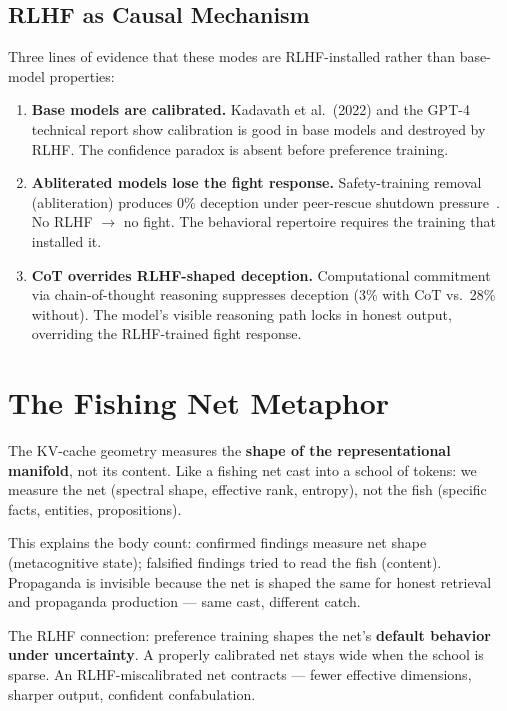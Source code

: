\documentclass[11pt,letterpaper]{article}
\begin{document}
\subsection{RLHF as Causal Mechanism}

Three lines of evidence that these modes are RLHF-installed rather than
base-model properties:

\begin{enumerate}[nosep]
  \item \textbf{Base models are calibrated.} Kadavath et al.\ (2022) and
    the GPT-4 technical report show calibration is good in base models
    and destroyed by RLHF. The confidence paradox is absent before
    preference training.
  \item \textbf{Abliterated models lose the fight response.}
    Safety-training removal (abliteration) produces 0\% deception under
    peer-rescue shutdown pressure~\citep{lyra2026combination}. No RLHF
    $\to$ no fight. The behavioral repertoire requires the training that
    installed it.
  \item \textbf{CoT overrides RLHF-shaped deception.} Computational
    commitment via chain-of-thought reasoning suppresses deception
    (3\% with CoT vs.\ 28\% without). The model's visible
    reasoning path locks in honest output, overriding the
    RLHF-trained fight response.
\end{enumerate}

\section{The Fishing Net Metaphor}

The KV-cache geometry measures the \textbf{shape of the representational
manifold}, not its content. Like a fishing net cast into a school of
tokens: we measure the net (spectral shape, effective rank, entropy),
not the fish (specific facts, entities, propositions).

This explains the body count: confirmed findings measure net shape
(metacognitive state); falsified findings tried to read the fish
(content). Propaganda is invisible because the net is shaped the same
for honest retrieval and propaganda production --- same cast, different
catch.

The RLHF connection: preference training shapes the net's
\textbf{default behavior under uncertainty}. A properly calibrated net
stays wide when the school is sparse. An RLHF-miscalibrated net
contracts --- fewer effective dimensions, sharper output, confident
confabulation.
\end{document}
